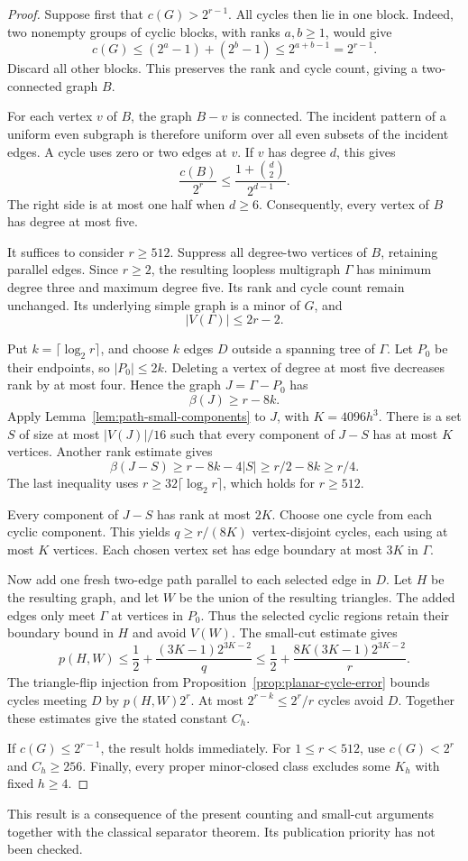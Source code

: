 \begin{proof}
Suppose first that $c(G)>2^{r-1}$.
All cycles then lie in one block.
Indeed, two nonempty groups of cyclic blocks, with ranks $a,b\ge1$, would give
\[
 c(G)\le(2^a-1)+(2^b-1)\le2^{a+b-1}=2^{r-1}.
\]
Discard all other blocks.
This preserves the rank and cycle count, giving a two-connected graph $B$.

For each vertex $v$ of $B$, the graph $B-v$ is connected.
The incident pattern of a uniform even subgraph is therefore uniform over all even subsets of the incident edges.
A cycle uses zero or two edges at $v$.
If $v$ has degree $d$, this gives
\[
 \frac{c(B)}{2^r}\le\frac{1+\binom d2}{2^{d-1}}.
\]
The right side is at most one half when $d\ge6$.
Consequently, every vertex of $B$ has degree at most five.

It suffices to consider $r\ge512$.
Suppress all degree-two vertices of $B$, retaining parallel edges.
Since $r\ge2$, the resulting loopless multigraph $\Gamma$ has minimum degree three and maximum degree five.
Its rank and cycle count remain unchanged.
Its underlying simple graph is a minor of $G$, and
\[
 |V(\Gamma)|\le2r-2.
\]

Put $k=\lceil\log_2r\rceil$, and choose $k$ edges $D$ outside a spanning tree of $\Gamma$.
Let $P_0$ be their endpoints, so $|P_0|\le2k$.
Deleting a vertex of degree at most five decreases rank by at most four.
Hence the graph $J=\Gamma-P_0$ has
\[
 \beta(J)\ge r-8k.
\]
Apply Lemma~\ref{lem:path-small-components} to $J$, with $K=4096h^3$.
There is a set $S$ of size at most $|V(J)|/16$ such that every component of $J-S$ has at most $K$ vertices.
Another rank estimate gives
\[
 \beta(J-S)\ge r-8k-4|S|
 \ge r/2-8k\ge r/4.
\]
The last inequality uses $r\ge32\lceil\log_2r\rceil$, which holds for $r\ge512$.

Every component of $J-S$ has rank at most $2K$.
Choose one cycle from each cyclic component.
This yields $q\ge r/(8K)$ vertex-disjoint cycles, each using at most $K$ vertices.
Each chosen vertex set has edge boundary at most $3K$ in $\Gamma$.

Now add one fresh two-edge path parallel to each selected edge in $D$.
Let $H$ be the resulting graph, and let $W$ be the union of the resulting triangles.
The added edges only meet $\Gamma$ at vertices in $P_0$.
Thus the selected cyclic regions retain their boundary bound in $H$ and avoid $V(W)$.
The small-cut estimate gives
\[
 p(H,W)\le\frac12+\frac{(3K-1)2^{3K-2}}{q}
 \le\frac12+\frac{8K(3K-1)2^{3K-2}}{r}.
\]
The triangle-flip injection from Proposition~\ref{prop:planar-cycle-error} bounds cycles meeting $D$ by $p(H,W)2^r$.
At most $2^{r-k}\le2^r/r$ cycles avoid $D$.
Together these estimates give the stated constant $C_h$.

If $c(G)\le2^{r-1}$, the result holds immediately.
For $1\le r<512$, use $c(G)<2^r$ and $C_h\ge256$.
Finally, every proper minor-closed class excludes some $K_h$ with fixed $h\ge4$.
\end{proof}

This result is a consequence of the present counting and small-cut arguments together with the classical separator theorem.
Its publication priority has not been checked.
